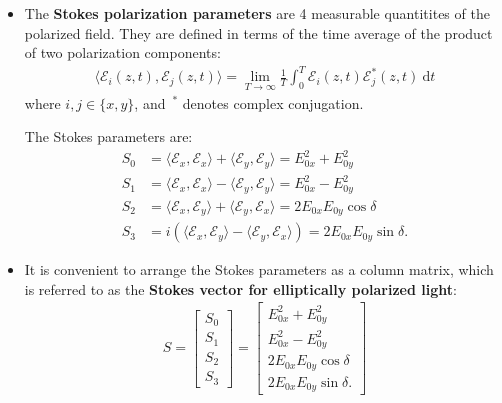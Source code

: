 \documentclass[10pt]{article}
\newcommand{\dee}{\mathrm{d}}
\newcommand{\ra}{\rightarrow}
\begin{document}
	\begin{itemize}
		\item The \textbf{Stokes polarization parameters} are 4 measurable quantitites of the polarized field.  They are defined in terms of the time average of the product of two polarization components:
		\begin{align*}
			\langle \mathcal{E}_i(z,t), \mathcal{E}_j(z,t) \rangle = \lim_{T \ra \infty} \frac{1}{T} \int_0^T \mathcal{E}_i(z,t) \mathcal{E}_j^*(z,t)\ \dee t
		\end{align*}
		where $i,j \in \{ x, y\}$, and $\,^*$ denotes complex conjugation.

		The Stokes parameters are:
		\begin{align*}
			S_0 &= \langle \mathcal{E}_x, \mathcal{E}_x  \rangle + \langle \mathcal{E}_y, \mathcal{E}_y \rangle = E_{0x}^2 + E_{0y}^2\\
			S_1 &= \langle \mathcal{E}_x, \mathcal{E}_x  \rangle - \langle \mathcal{E}_y, \mathcal{E}_y \rangle = E_{0x}^2 - E_{0y}^2 \\
			S_2 &= \langle \mathcal{E}_x, \mathcal{E}_y  \rangle + \langle \mathcal{E}_y, \mathcal{E}_x \rangle = 2 E_{0x} E_{0y} \cos\delta \\
			S_3 &= i (\langle \mathcal{E}_x, \mathcal{E}_y  \rangle - \langle \mathcal{E}_y, \mathcal{E}_x \rangle) = 2E_{0x} E_{0y} \sin\delta.
		\end{align*}

		\item It is convenient to arrange the Stokes parameters as a column matrix, which is referred to as the \textbf{Stokes vector for elliptically polarized light}:
		\begin{align*}
			S = \begin{bmatrix}
				S_0 \\
				S_1 \\
				S_2 \\
				S_3
			\end{bmatrix}
			= \begin{bmatrix}
				E_{0x}^2 + E_{0y}^2 \\
				E_{0x}^2 - E_{0y}^2 \\
				2 E_{0x} E_{0y} \cos\delta \\
				2 E_{0x} E_{0y} \sin\delta.
			\end{bmatrix}
		\end{align*}


\end{itemize}
\end{document}
